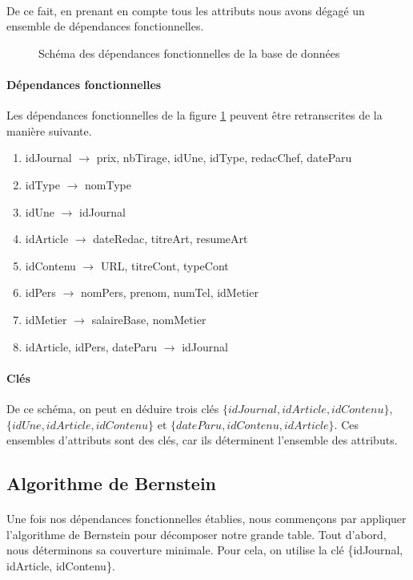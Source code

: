 \paragraph{}{De ce fait, en prenant en compte tous les attributs nous avons dégagé un ensemble de dépendances fonctionnelles.}

\begin{figure}
	\label{sch_df}
	\centering
	
	\caption{Schéma des dépendances fonctionnelles de la base de données}
\end{figure} 

\paragraph{Dépendances fonctionnelles}{Les dépendances fonctionnelles de la figure \ref{sch_df} peuvent être retranscrites de la manière suivante.
}
\begin{enumerate}
    \item[(1)] idJournal $\rightarrow$ prix, nbTirage, idUne, idType, redacChef, dateParu
    \item[(2)] idType $\rightarrow$ nomType
    \item[(3)] idUne $\rightarrow$ idJournal
    \item[(4)] idArticle $\rightarrow$ dateRedac, titreArt, resumeArt
    \item[(5)] idContenu $\rightarrow$ URL, titreCont, typeCont
    \item[(6)] idPers $\rightarrow$ nomPers, prenom, numTel, idMetier
    \item[(7)] idMetier $\rightarrow$ salaireBase, nomMetier
    \item[(8)] idArticle, idPers, dateParu $\rightarrow$ idJournal
\end{enumerate}

\paragraph{Clés}{
    De ce schéma, on peut en déduire trois clés $\{idJournal, idArticle, idContenu\}$, $\{idUne, idArticle, idContenu\}$ et $\{dateParu, idContenu, idArticle\}$. Ces ensembles d'attributs sont des clés, car ils déterminent l'ensemble des attributs.
}

\subsection{Algorithme de Bernstein}
\paragraph{}{Une fois nos dépendances fonctionnelles établies, nous commençons par appliquer l'algorithme de Bernstein pour décomposer notre grande table. Tout d'abord, nous déterminons sa couverture minimale. Pour cela, on utilise la clé \{idJournal, idArticle, idContenu\}.
}

